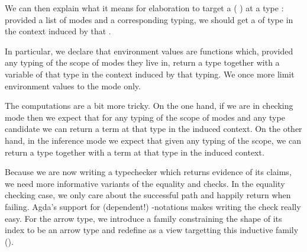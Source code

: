 We can then explain what it means for elaboration to target  a
({ }) at a type : provided a list of modes and a corresponding
typing, we should get a  of type  in the context induced by that .


In particular, we declare that environment values are functions which, provided any
typing of the scope of modes they live in, return a type together with a variable of
that type in the context induced by that typing. We once more limit environment values
to the  mode only.


The computations are a bit more tricky. On the one hand, if we are in checking mode
then we expect that for any typing of the scope of modes and any type candidate we
can  return a term at that type in the induced context. On the other hand,
in the inference mode we expect that given any typing of the scope, we can 
return a type together with a term at that type in the induced context.


Because we are now writing a typechecker which returns evidence of its claims, we need
more informative variants of the equality and  checks. In the equality
checking case, we only care about the successful path and happily return 
when failing. Agda's support for (dependent!) -notations makes writing the check
really easy. For the arrow type, we introduce a family  constraining the
shape of its index to be an arrow type and redefine  as a view targetting
this inductive family (\cite{Wadler:1987:VWP:41625.41653}).

\begin{figure}[h]
\begin{minipage}{0.5\textwidth}
\end{minipage}
\begin{minipage}{0.5\textwidth}
\end{minipage}
\end{figure}

